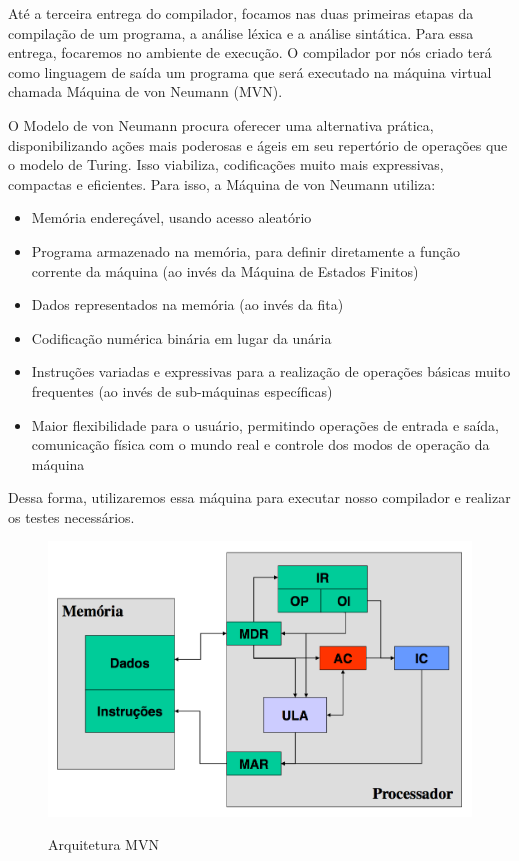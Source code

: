 
Até a terceira entrega do compilador, focamos nas duas primeiras etapas da compilação de um programa, a análise léxica e a análise sintática. Para essa entrega, focaremos no ambiente de execução. O compilador por nós criado terá como linguagem de saída um programa que será executado na máquina virtual chamada Máquina de von Neumann (MVN).

O Modelo de von Neumann procura oferecer uma alternativa prática, disponibilizando ações mais poderosas e ágeis em seu repertório de operações que o modelo de Turing. Isso viabiliza, codificações muito mais expressivas, compactas e eficientes. Para isso, a Máquina de von Neumann utiliza:

\begin{itemize}
	\item Memória endereçável, usando acesso aleatório
	\item Programa armazenado na memória, para definir diretamente a função corrente da máquina (ao invés da Máquina de Estados Finitos)
	\item Dados representados na memória (ao invés da fita)
	\item Codificação numérica binária em lugar da unária
	\item Instruções variadas e expressivas para a realização de operações básicas muito frequentes (ao invés de sub-máquinas específicas)
	\item Maior flexibilidade para o usuário, permitindo operações de entrada e saída, comunicação física com o mundo real e controle dos modos de operação da máquina 
\end{itemize}

Dessa forma, utilizaremos essa máquina para executar nosso compilador e realizar os testes necessários.

\begin{figure}[ht]
	\centering
	\caption{Arquitetura MVN}
	\includegraphics[width=\textwidth]{images/arquitetura-mvn.png}
	\label{fig:arquitetura-mvn}
\end{figure}

